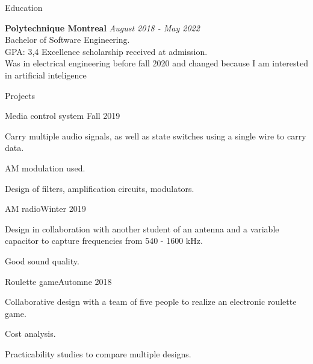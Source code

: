 \documentclass{resume} %
\begin{document}
	
	
	\begin{rSection}{Education}
		
		{\bf Polytechnique Montreal} \hfill {\em August 2018 - May 2022} 
		\\ Bachelor of Software Engineering.
		\\GPA: 3,4 \hspace{0.5cm}  Excellence scholarship received at admission.
		\\Was in electrical engineering before fall 2020 and changed because I am interested in artificial inteligence
	\end{rSection}
	
	\begin{rSection}{Projects}
		
		\begin{rSubsection}{Media control system }{Fall 2019}{}{}
			\item   Carry multiple audio signals, as well as state switches using a single wire to carry data.
			\item   AM modulation used.
			\item   Design of filters, amplification circuits, modulators.
			
		\end{rSubsection}
		
		\begin{rSubsection}{AM radio}{Winter 2019}{}{}
			\item   Design in collaboration with another student of an antenna and a variable capacitor to capture frequencies from 540 - 1600 kHz.
			\item   Good sound quality.
			
		\end{rSubsection}
		
		\begin{rSubsection}{Roulette game}{Automne 2018}{}{}
			\item  Collaborative design with a team of five people to realize an electronic roulette game.
			\item  Cost analysis.
			\item  Practicability studies to compare multiple designs.
		\end{rSubsection} 
		
	\end{rSection}
	
\end{document}
